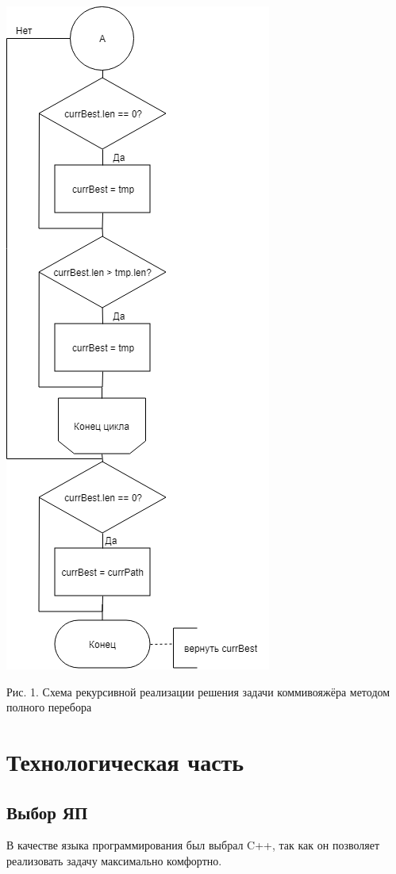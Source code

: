 \documentclass[12pt]{report}
\begin{document}
\begin{center}
		\includegraphics[scale=0.7]{Rec2.png}
		
		Рис. 1. Схема рекурсивной реализации решения задачи коммивояжёра методом полного перебора
	\end{center}

	\chapter{Технологическая часть}
	\section{Выбор ЯП}
	В качестве языка программирования был выбрал C++, так как он позволяет реализовать задачу максимально комфортно.
	
\end{document}
